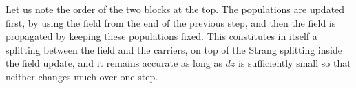 Let us note the order of the two blocks at the top. The populations are updated first, by using the field from the end of the previous step, and then the field is propagated by keeping these populations fixed. This constitutes in itself a splitting between the field and the carriers, on top of the Strang splitting inside the field update, and it remains accurate as long as $dz$ is sufficiently small so that neither changes much over one step.